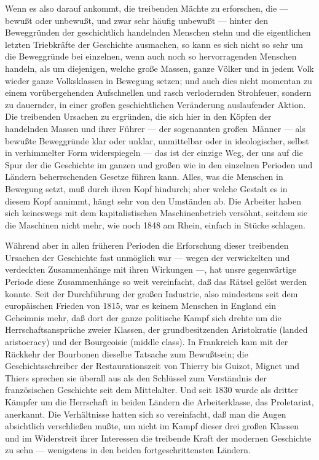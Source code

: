 Wenn es also darauf ankommt, die treibenden Mächte zu
erforschen, die --- bewußt oder unbewußt, und zwar sehr häufig unbewußt ---
hinter den Beweggründen der geschichtlich handelnden Menschen stehn und
die eigentlichen letzten Triebkräfte der Geschichte ausmachen, so kann
es sich nicht so sehr um die Beweggründe bei einzelnen, wenn auch noch
so hervorragenden Menschen handeln, als um diejenigen, welche große
Massen, ganze Völker und in jedem Volk wieder ganze Volksklassen in
Bewegung setzen; und auch dies nicht momentan zu einem vorübergehenden
Aufschnellen und rasch verlodernden Strohfeuer, sondern zu dauernder, in
einer großen geschichtlichen Veränderung auslaufender Aktion. Die
treibenden Ursachen zu ergründen, die sich hier in den Köpfen der
handelnden Massen und ihrer Führer --- der sogenannten großen\est\ Männer --- als
bewußte Beweggründe klar oder unklar, unmittelbar oder in ideologischer,
selbst in verhimmelter Form widerspiegeln --- das ist der einzige Weg, der
uns auf die Spur der die Geschichte im ganzen und großen wie in den
einzelnen Perioden und Ländern beherrschenden Gesetze führen kann.
Alles, was die Menschen in Bewegung setzt, muß durch ihren Kopf
hindurch; aber welche Gestalt es in diesem Kopf annimmt, hängt sehr von
den Umständen ab. Die Arbeiter haben sich keineswegs mit dem
kapitalistischen Maschinenbetrieb versöhnt, seitdem sie die Maschinen
nicht mehr, wie noch 1848 am Rhein, einfach in Stücke schlagen.

Während aber in allen früheren Perioden die Erforschung dieser
treibenden Ursachen der
Geschichte fast unmöglich war --- wegen der verwickelten und verdeckten
Zusammenhänge mit ihren Wirkungen ---, hat unsre gegenwärtige Periode
diese Zusammenhänge so weit vereinfacht, daß das Rätsel gelöst werden
konnte. Seit der Durchführung der großen Industrie, also mindestens seit
dem europäischen Frieden von 1815, war es keinem Menschen in England ein
Geheimnis mehr, daß dort der ganze politische Kampf sich drehte um die
Herrschaftsansprüche zweier Klassen, der grundbesitzenden Aristokratie
(landed aristocracy) und der Bourgeoisie (middle class). In Frankreich
kam mit der Rückkehr der Bourbonen dieselbe Tatsache zum Bewußtsein; die
Geschichtsschreiber der Restaurationszeit von Thierry bis Guizot, Mignet
und Thiers sprechen sie überall aus als den Schlüssel zum Verständnis
der französischen Geschichte seit dem Mittelalter. Und seit 1830 wurde
als dritter Kämpfer um die Herrschaft in beiden Ländern die
Arbeiterklasse, das Proletariat, anerkannt. Die Verhältnisse hatten sich
so vereinfacht, daß man die Augen absichtlich verschließen mußte, um
nicht im Kampf dieser drei großen Klassen und im Widerstreit ihrer
Interessen die treibende Kraft der modernen Geschichte zu sehn ---
wenigstens in den beiden fortgeschrittensten Ländern.

